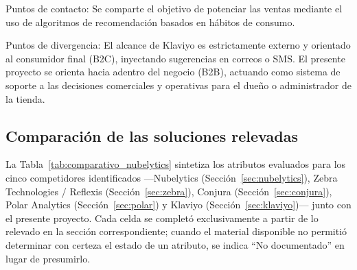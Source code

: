 Puntos de contacto: Se comparte el objetivo de potenciar las ventas mediante el uso de algoritmos de recomendación basados en hábitos de consumo.

Puntos de divergencia: El alcance de Klaviyo es estrictamente externo y orientado al consumidor final (B2C), inyectando sugerencias en correos o SMS. El presente proyecto se orienta hacia adentro del negocio (B2B), actuando como sistema de soporte a las decisiones comerciales y operativas para el dueño o administrador de la tienda.

\subsection{Comparación de las soluciones relevadas}
\label{sec:comparacion-estado-arte}

La Tabla~\ref{tab:comparativo_nubelytics} sintetiza los atributos evaluados para los cinco competidores identificados ---Nubelytics (Sección~\ref{sec:nubelytics}), Zebra Technologies / Reflexis (Sección~\ref{sec:zebra}), Conjura (Sección~\ref{sec:conjura}), Polar Analytics (Sección~\ref{sec:polar}) y Klaviyo (Sección~\ref{sec:klaviyo})--- junto con el presente proyecto. Cada celda se completó exclusivamente a partir de lo relevado en la sección correspondiente; cuando el material disponible no permitió determinar con certeza el estado de un atributo, se indica ``No documentado'' en lugar de presumirlo.


